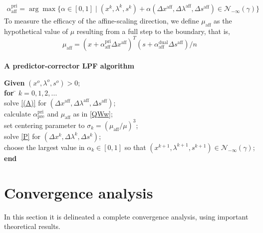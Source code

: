 \documentclass[a4paper,10 pt,titlepage,twoside]{book}
\theoremstyle{plain}
\theoremstyle{definition}
\theoremstyle{remark}
\begin{document}
\begin{align}\label{QWw}
\alpha_{\text{aff}}^{\text{pri}}=\arg\max\{\alpha\in[0,1]\;|\;(x^{k}, \lambda^{k}, s^{k})+ \alpha(\Delta x^{\text{aff}}, \Delta\lambda^{\text{aff}}, \Delta s^{\text{aff}})\in\mathcal{N}_{-\infty}(\gamma)\}
\end{align}
To measure the efficacy of the affine-scaling direction, we define $\mu_{\text{aff}}$ as the hypothetical value of $\mu$ resulting from a full step to the boundary, that is,
\begin{equation*}
\mu_{\text{aff}}= (x+\alpha_{\text{aff}}^{\text{pri}}\Delta x^{\text{aff}})^{T}(s+\alpha_{\text{aff}}^{\text{dual}}\Delta s^{\text{aff}})/n
\end{equation*}
\\
\textbf{A predictor-corrector LPF algorithm}
\begin{tabbing}
	\textbf{Given} $(x^{o}, \lambda^{o}, s^{o})> 0$; \\
	\textbf{for} \= $k = 0, 1, 2,...$ \\
	\> solve \ref{(A)} for $(\Delta x^{\text{aff}},\Delta \lambda^{\text{aff}},\Delta s^{\text{aff}})$;\\
	\> calculate $\alpha_{\text{pre}}^{\text{pri}}$ and $\mu_{\text{aff}}$ as in \ref{QWw};\\
	\> set centering parameter to $\sigma_{k} = (\mu_{\text{aff}}/\mu)^{3}$; \\
	\> solve \ref{P} for $(\Delta x^{k},\Delta \lambda^{k},\Delta s^{k})$;\\
	\> choose the largest value in $\alpha_{k}\in[0,1]$ so that $(x^{k+1}, \lambda^{k+1}, s^{k+1})\in\mathcal{N}_{-\infty}(\gamma)$;\\
	\textbf{end}
\end{tabbing}
 
%
\chapter{Convergence analysis}
In this section it is delineated a complete convergence analysis, using important theoretical results. 
\end{document}
